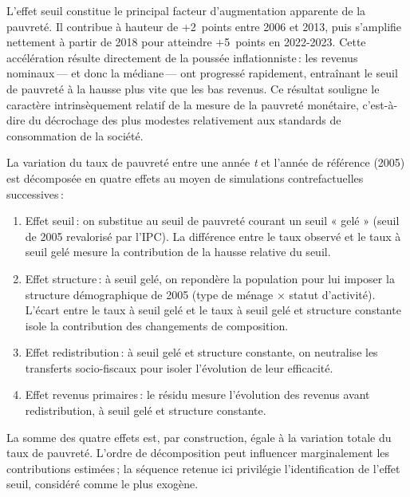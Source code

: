 \documentclass[
  french,
  9pt,
  a4paper,
]{article}
\providecommand{\tightlist}{%
  \setlength{\itemsep}{0pt}\setlength{\parskip}{0pt}}
\begin{document}
L'effet seuil constitue le principal facteur d'augmentation apparente de
la pauvreté. Il contribue à hauteur de +2~points entre 2006 et 2013,
puis s'amplifie nettement à partir de 2018 pour atteindre +5~points en
2022-2023. Cette accélération résulte directement de la poussée
inflationniste\,: les revenus nominaux\,--- et donc la médiane\,--- ont
progressé rapidement, entraînant le seuil de pauvreté à la hausse plus
vite que les bas revenus. Ce résultat souligne le caractère
intrinsèquement relatif de la mesure de la pauvreté monétaire,
c'est-à-dire du décrochage des plus modestes relativement aux standards
de consommation de la société.

\begin{tcolorbox}[enhanced jigsaw, leftrule=.75mm, breakable, toptitle=1mm, toprule=.15mm, title={Encadré 2\,--- Méthode de décomposition séquentielle}, opacityback=0, arc=.35mm, opacitybacktitle=0.6, colback=white, coltitle=black, colframe=quarto-callout-note-color-frame, left=2mm, colbacktitle=quarto-callout-note-color!10!white, bottomtitle=1mm, titlerule=0mm, rightrule=.15mm, bottomrule=.15mm]

La variation du taux de pauvreté entre une année \emph{t} et l'année de
référence (2005) est décomposée en quatre effets au moyen de simulations
contrefactuelles successives\,:

\begin{enumerate}
\def\labelenumi{\arabic{enumi}.}
\tightlist
\item
  Effet seuil\,: on substitue au seuil de pauvreté courant un seuil «
  gelé » (seuil de 2005 revalorisé par l'IPC). La différence entre le
  taux observé et le taux à seuil gelé mesure la contribution de la
  hausse relative du seuil.
\item
  Effet structure\,: à seuil gelé, on repondère la population pour lui
  imposer la structure démographique de 2005 (type de ménage × statut
  d'activité). L'écart entre le taux à seuil gelé et le taux à seuil
  gelé et structure constante isole la contribution des changements de
  composition.
\item
  Effet redistribution\,: à seuil gelé et structure constante, on
  neutralise les transferts socio-fiscaux pour isoler l'évolution de
  leur efficacité.
\item
  Effet revenus primaires\,: le résidu mesure l'évolution des revenus
  avant redistribution, à seuil gelé et structure constante.
\end{enumerate}

La somme des quatre effets est, par construction, égale à la variation
totale du taux de pauvreté. L'ordre de décomposition peut influencer
marginalement les contributions estimées\,; la séquence retenue ici
privilégie l'identification de l'effet seuil, considéré comme le plus
exogène.

\end{tcolorbox}
\end{document}
